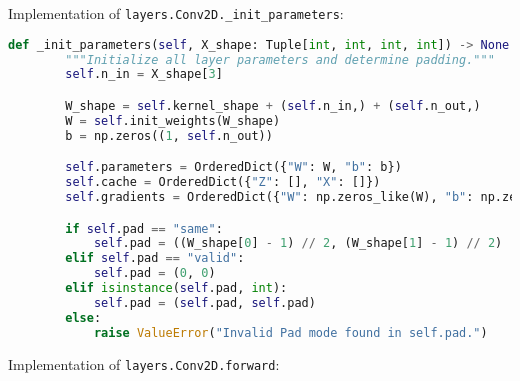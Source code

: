 Implementation of \texttt{layers.Conv2D._init_parameters}:

\begin{lstlisting}[language=Python]
    def _init_parameters(self, X_shape: Tuple[int, int, int, int]) -> None:
        """Initialize all layer parameters and determine padding."""
        self.n_in = X_shape[3]

        W_shape = self.kernel_shape + (self.n_in,) + (self.n_out,)
        W = self.init_weights(W_shape)
        b = np.zeros((1, self.n_out))

        self.parameters = OrderedDict({"W": W, "b": b})
        self.cache = OrderedDict({"Z": [], "X": []})
        self.gradients = OrderedDict({"W": np.zeros_like(W), "b": np.zeros_like(b)})

        if self.pad == "same":
            self.pad = ((W_shape[0] - 1) // 2, (W_shape[1] - 1) // 2)
        elif self.pad == "valid":
            self.pad = (0, 0)
        elif isinstance(self.pad, int):
            self.pad = (self.pad, self.pad)
        else:
            raise ValueError("Invalid Pad mode found in self.pad.")

\end{lstlisting}

Implementation of \texttt{layers.Conv2D.forward}:

